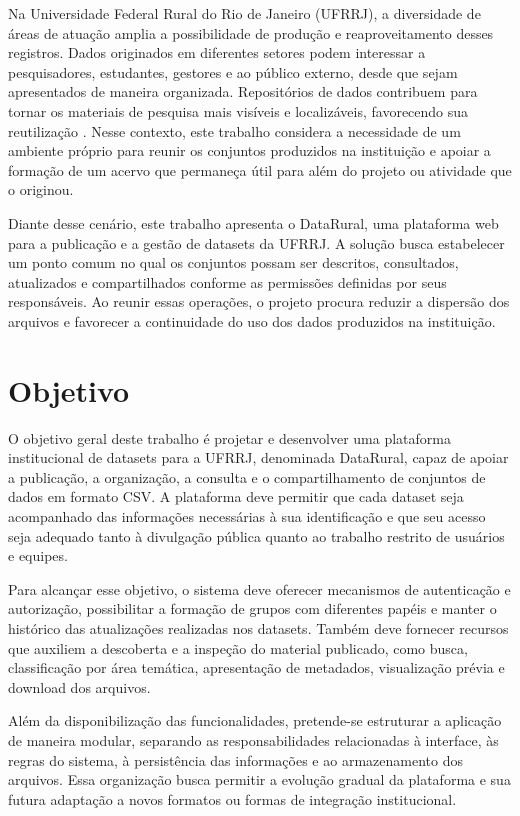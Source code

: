 Na Universidade Federal Rural do Rio de Janeiro (UFRRJ), a diversidade de áreas de atuação amplia a possibilidade de produção e reaproveitamento desses registros. Dados originados em diferentes setores podem interessar a pesquisadores, estudantes, gestores e ao público externo, desde que sejam apresentados de maneira organizada. Repositórios de dados contribuem para tornar os materiais de pesquisa mais visíveis e localizáveis, favorecendo sua reutilização \cite{pampel2013making}. Nesse contexto, este trabalho considera a necessidade de um ambiente próprio para reunir os conjuntos produzidos na instituição e apoiar a formação de um acervo que permaneça útil para além do projeto ou atividade que o originou.

Diante desse cenário, este trabalho apresenta o DataRural, uma plataforma web para a publicação e a gestão de datasets da UFRRJ. A solução busca estabelecer um ponto comum no qual os conjuntos possam ser descritos, consultados, atualizados e compartilhados conforme as permissões definidas por seus responsáveis. Ao reunir essas operações, o projeto procura reduzir a dispersão dos arquivos e favorecer a continuidade do uso dos dados produzidos na instituição.

\section{Objetivo}\label{sec:INTRODUCAO_OBJETIVO}

O objetivo geral deste trabalho é projetar e desenvolver uma plataforma institucional de datasets para a UFRRJ, denominada DataRural, capaz de apoiar a publicação, a organização, a consulta e o compartilhamento de conjuntos de dados em formato CSV. A plataforma deve permitir que cada dataset seja acompanhado das informações necessárias à sua identificação e que seu acesso seja adequado tanto à divulgação pública quanto ao trabalho restrito de usuários e equipes.

Para alcançar esse objetivo, o sistema deve oferecer mecanismos de autenticação e autorização, possibilitar a formação de grupos com diferentes papéis e manter o histórico das atualizações realizadas nos datasets. Também deve fornecer recursos que auxiliem a descoberta e a inspeção do material publicado, como busca, classificação por área temática, apresentação de metadados, visualização prévia e download dos arquivos.

Além da disponibilização das funcionalidades, pretende-se estruturar a aplicação de maneira modular, separando as responsabilidades relacionadas à interface, às regras do sistema, à persistência das informações e ao armazenamento dos arquivos. Essa organização busca permitir a evolução gradual da plataforma e sua futura adaptação a novos formatos ou formas de integração institucional.


